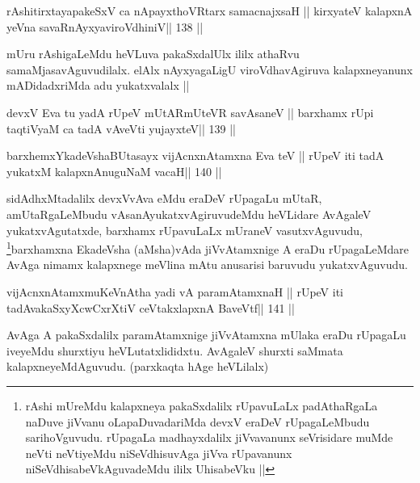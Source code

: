 
\begin{shl}
rAshitirxtayapakeSxV ca nApayxthoVR\s tarx samacnajxsaH ||
kirxyateV kalapxnA yeVna savaRnAyxyaviroVdhiniV\hfill || 138 ||
\end{shl}

\begin{artha}
mUru rAshigaLeMdu heVLuva pakaSxdalUlx ililx athaRvu
samaMjasavAguvudilalx. elAlx nAyxyagaLigU viroVdhavAgiruva
kalapxneyanunx mADidadxriMda adu yukatxvalalx ||
\end{artha}


\begin{shl}
devxV Eva tu yadA rUpeV mUtARmUteVR savAsaneV ||
barxhamx rUpi taqtiVyaM ca tadA vAveVti yujayxteV\hfill || 139 ||
\end{shl}

\begin{shl}
barxhemxYkadeVshaBUtasayx vijAcnxnAtamxna Eva teV ||
rUpeV iti tadA yukatxM kalapxnAnuguNaM vacaH\hfill || 140 ||
\end{shl}

\begin{artha}
sidAdhxMtadalilx devxVvAva eMdu eraDeV rUpagaLu  mUtaR, amUtaRgaLeMbudu
vAsanAyukatxvAgiruvudeMdu heVLidare AvAgaleV yukatxvAgutatxde, barxhamx
rUpavuLaLx mUraneV vasutxvAguvudu, \footnote[1]{rAshi mUreMdu
  kalapxneya pakaSxdalilx rUpavuLaLx padAthaRgaLa naDuve jiVvanu
  oLapaDuvadariMda devxV eraDeV rUpagaLeMbudu sarihoVguvudu. rUpagaLa
  madhayxdalilx jiVvavanunx seVrisidare muMde neVti neVtiyeMdu
  niSeVdhisuvAga jiVva rUpavanunx niSeVdhisabeVkAguvadeMdu ililx
  UhisabeVku ||}barxhamxna EkadeVsha
(aMsha)vAda jiVvAtamxnige A eraDu rUpagaLeMdare AvAga nimamx
kalapxnege meVlina mAtu anusarisi baruvudu yukatxvAguvudu.
\end{artha}


\begin{shl}
vijAcnxnAtamxmuKeVnAtha yadi vA paramAtamxnaH ||
rUpeV iti tadA\s vakaSxyXcwCxrXtiV ceVtakxlapxnA BaveVtf\hfill || 141 ||
\end{shl}

\begin{artha}
AvAga A pakaSxdalilx paramAtamxnige jiVvAtamxna mUlaka eraDu rUpagaLu
iveyeMdu shurxtiyu heVLutatxlididxtu. AvAgaleV shurxti saMmata
kalapxneyeMdAguvudu. (parxkaqta hAge heVLilalx)
\end{artha}

